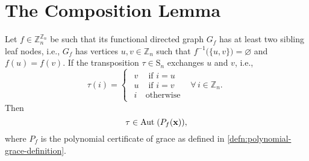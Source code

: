 \section{The Composition Lemma}

\begin{lemma}\label{lem:transposition-invariance}
Let $f\in\mathbb{Z}_{n}^{\mathbb{Z}_{n}}$ be such that its functional directed graph $G_{f}$ has at least two sibling leaf nodes, i.e., $G_f$ has vertices $u,v\in\mathbb{Z}_{n}$ such that
$f^{-1}\big(\{u,v\}\big)=\varnothing$ and $f(u)=f(v)$. If
the transposition $\tau\in\textrm{S}_{n}$ exchanges $u$ and
$v$, i.e.,
\[
\tau(i)=\begin{cases}
\begin{array}{cc}
v & \text{ if }i=u\\
u & \text{ if }i=v\\
i & \text{otherwise}
\end{array} & \forall\,i\in\mathbb{Z}_{n}.\end{cases}
\]
Then
\begin{equation}
\tau\in\text{Aut}\;(P_{f}({\bf x})),
\end{equation}
where $P_f$ is the polynomial certificate of grace as defined in \ref{defn:polynomial-grace-definition}.
\end{lemma}

